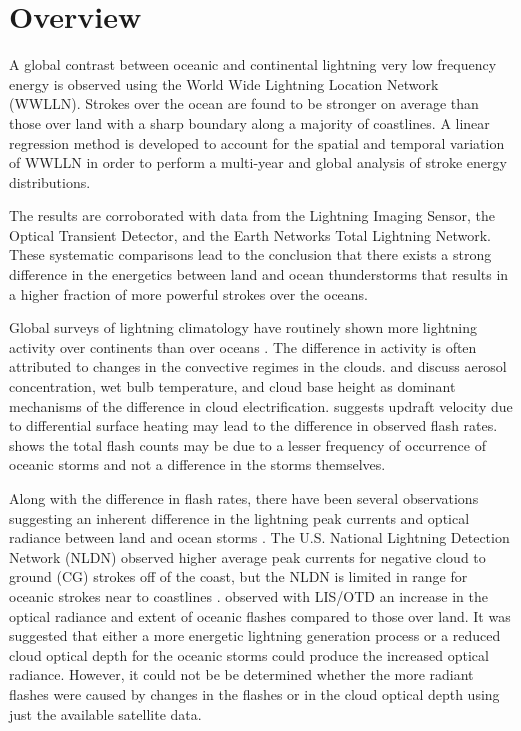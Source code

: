 \section{Overview}


A global contrast between oceanic and continental lightning very low frequency energy is observed using the World Wide Lightning Location Network (WWLLN).
Strokes over the ocean are found to be stronger on average than those over land with a sharp boundary along a majority of coastlines.
A linear regression method is developed to account for the spatial and temporal variation of WWLLN in order to perform a multi-year and global analysis of stroke energy distributions.

The results are corroborated with data from the Lightning Imaging Sensor, the Optical Transient Detector, and the Earth Networks Total Lightning Network.
These systematic comparisons lead to the conclusion that there exists a strong difference in the energetics between land and ocean thunderstorms that results in a higher fraction of more powerful strokes over the oceans. 


Global surveys of lightning climatology have routinely shown more lightning activity over continents than over oceans \citep{Christian2003}.
The difference in activity is often attributed to changes in the convective regimes in the clouds.
\citet{Williams2002} and \citet{Williams2005} discuss aerosol concentration, wet bulb temperature, and cloud base height as dominant mechanisms of the difference in cloud electrification.
\citet{Zipser1994} suggests updraft velocity due to differential surface heating may lead to the difference in observed flash rates.
\citet{Boccippio2000} shows the total flash counts may be due to a lesser frequency of occurrence of oceanic storms and not a difference in the storms themselves.

Along with the difference in flash rates, there have been several observations suggesting an inherent difference in the lightning peak currents and optical radiance between land and ocean storms \citep{Seity2001, Ishii2010}. 
The U.S. National Lightning Detection Network (NLDN) observed higher average peak currents for negative cloud to ground (CG) strokes off of the coast, but the NLDN is limited in range for oceanic strokes near to coastlines \citep{Rudlosky2010, Lyons1998}.
\citet{Boccippio2000} observed with LIS/OTD an increase in the optical radiance and extent of oceanic flashes compared to those over land.
It was suggested that either a more energetic lightning generation process or a reduced cloud optical depth for the oceanic storms could produce the increased optical radiance.
However, it could not be be determined whether the more radiant flashes were caused by changes in the flashes or in the cloud optical depth using just the available satellite data.

